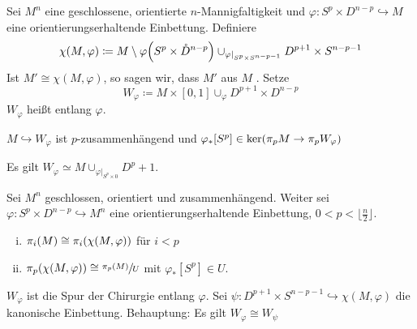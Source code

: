 \begin{definition}
	Sei $M^n$ eine geschlossene, orientierte $n$-Mannigfaltigkeit und $\varphi \colon S^p \times D^{n-p} \hookrightarrow M$ eine orientierungserhaltende Einbettung.
	Definiere 
	\[
		\chi(M,\varphi) \coloneqq M \setminus \varphi \enbrace*{S^p \times \mathring{D}^{n-p}} \cup_{\varphi|_{S^p\times S^{n-p-1}}} D^{p+1} \times S^{n-p-1}
	\]
	Ist $M' \cong \chi(M,\varphi)$, so sagen wir, dass $M'$ aus $M$ .
	Setze 
	\[
		W_\varphi \coloneqq M \times [0,1] \cup_\varphi D^{p+1} \times D^{n-p}
	\]
	$W_\varphi$ heißt  entlang $\varphi$.  
\end{definition}

\begin{lemma}
	$M \hookrightarrow W_\varphi$ ist $p$-zusammenhängend und $\varphi_*[S^p] \in \ker \enbrace*{\pi_p M \to \pi_p W_\varphi}$
\end{lemma}
\begin{beweis}
	Es gilt $W_\varphi \simeq M \cup_{\varphi|_{S^p \times 0}} D^p+1$.
\end{beweis}

\begin{lemma}
	Sei $M^n$ geschlossen, orientiert und zusammenhängend.
	Weiter sei $\varphi \colon S^p \times D^{n-p} \hookrightarrow M^n$ eine orientierungserhaltende Einbettung, $0 < p < \lfloor \frac{n}{2} \rfloor$.
	\begin{enumerate}[(i)]
		\item $\pi_i(M) \cong \pi_i \enbrace*{\chi(M,\varphi)}$ für $i<p$
		\item $\pi_p \enbrace*{\chi(M,\varphi)} \cong \sfrac{\pi_p(M)}{U}$ mit $\varphi_*[S^p] \in U$.
	\end{enumerate}
\end{lemma}
\begin{beweis}[Skizze]
	$W_\varphi$ ist die Spur der Chirurgie entlang $\varphi$. 
	Sei $\psi \colon D^{p+1} \times S^{n-p-1} \hookrightarrow \chi(M,\varphi)$ die kanonische Einbettung.
	Behauptung: Es gilt $W_\varphi \cong W_\psi$
	
\end{beweis}

